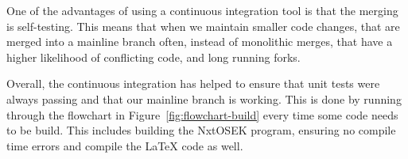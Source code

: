 One of the advantages of using a continuous integration tool is that the merging is self-testing.
This means that when we maintain smaller code changes, that are merged into a mainline branch often, instead of monolithic merges, that have a higher likelihood of conflicting code, and long running forks.

Overall, the continuous integration has helped to ensure that unit tests were always passing and that our mainline branch is working.
This is done by running through the flowchart in Figure~\ref{fig:flowchart-build} every time some code needs to be build.
This includes building the NxtOSEK program, ensuring no compile time errors and compile the \LaTeX{} code as well.
